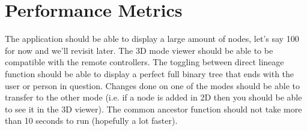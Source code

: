 \documentclass{article}
\begin{document}
\section{Performance Metrics}
The application should be able to display a large amount of nodes, let's say 100 for now and we'll revisit later. The 3D mode viewer should be able to be compatible with the remote controllers. The toggling between direct lineage function should be able to display a perfect full binary tree that ends with the user or person in question. Changes done on one of the modes should be able to transfer to the other mode (i.e. if a node is added in 2D then you should be able to see it in the 3D viewer). The common ancestor function should not take more than 10 seconds to run (hopefully a lot faster). 
\end{document}
